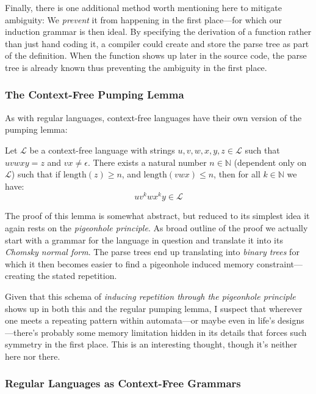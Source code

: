 \documentclass[twoside]{article}
\newcommand{\length}{\mbox{length}}
\begin{document}
Finally, there is one additional method worth mentioning here to mitigate ambiguity: We \emph{prevent} it from happening in
the first place---for which our induction grammar is then ideal. By specifying the derivation of a function rather than just
hand coding it, a compiler could create and store the parse tree as part of the definition. When the function shows up later
in the source code, the parse tree is already known thus preventing the ambiguity in the first place.

\subsubsection*{The Context-Free Pumping Lemma}

As with regular languages, context-free languages have their own version of the pumping lemma:

\begin{center}
\begin{minipage}{13cm}
Let $ \mathcal{L} $ be a context-free language with strings $ u,v,w,x,y,z \in \mathcal{L} $ such that $ uvwxy = z $
and  $ vx \neq \epsilon $. There exists a natural number $ n \in \mathbb{N} $ (dependent only on $ \mathcal{L} $)
such that if $ \length(z) \ge n $, and $ \length(vwx) \le n $, then for all $ k\in\mathbb{N} $ we have:
$$ uv^kwx^ky \in \mathcal{L} $$
\end{minipage}
\end{center}

The proof of this lemma is somewhat abstract, but reduced to its simplest idea it again rests on the
\emph{pigeonhole principle}. As broad outline of the proof we actually start with a grammar for the language
in question and translate it into its \emph{Chomsky normal form}. The parse trees end up translating into
\emph{binary trees} for which it then becomes easier to find a pigeonhole induced memory constraint---creating
the stated repetition.

Given that this schema of \emph{inducing repetition through the pigeonhole principle} shows up in both this and the
regular pumping lemma, I suspect that wherever one meets a repeating pattern within automata---or maybe even in life's
designs---there's probably some memory limitation hidden in its details that forces such symmetry in the first place.
This is an interesting thought, though it's neither here nor there.

\subsubsection*{Regular Languages as Context-Free Grammars}
\end{document}
